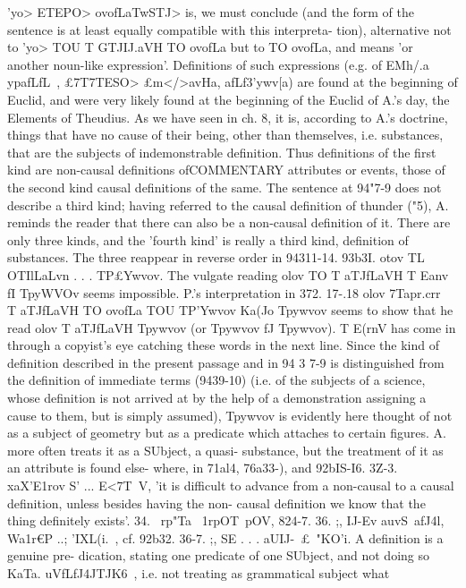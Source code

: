 {{{{{{{{{{{{{{{{{{{{{{{{{{{{{{{{{{{{{{{'\6yo> ETEPO> ovofLaTwSTJ> is, we must conclude (and the form of
the sentence is at least equally compatible with this interpreta-
tion), alternative not to '\6yo> TOU T{ GTJIJ.a{VH TO ovofLa but to TO
ovofLa, and means 'or another noun-like expression'. Definitions
of such expressions (e.g. of EMh/.a ypafLfL~, £7T{7TESO> £m</>avHa,
afLf3'\ELa ywv[a) are found at the beginning of Euclid, and were
very likely found at the beginning of the Euclid of A.'s day, the
Elements of Theudius.
As we have seen in ch. 8, it is, according to A.'s doctrine, things
that have no cause of their being, other than themselves, i.e.
substances, that are the subjects of indemonstrable definition.
Thus definitions of the first kind are non-causal definitions ofCOMMENTARY
attributes or events, those of the second kind causal definitions
of the same. The sentence at 94"7-9 does not describe a third
kind; having referred to the causal definition of thunder ("5), A.
reminds the reader that there can also be a non-causal definition
of it. There are only three kinds, and the 'fourth kind' is really
a third kind, definition of substances. The three reappear in
reverse order in 94311-14.
93b3I. otov TL OTIlLaLvn . . . TP£Ywvov. The vulgate reading
olov TO T{ aTJfLa{VH T{ Eanv fI Tp{yWVOv seems impossible. P.'s
interpretation in 372. 17-.18 olov 7Tapr.crr~ T{ aTJfLa{VH TO ovofLa TOU
TP'Ywvov Ka(Jo Tp{ywvov seems to show that he read olov T{ aTJfLa{VH
Tp{ywvov (or Tp{ywvov fJ Tp{ywvov). T{ E(rnV has come in through a
copyist's eye catching these words in the next line.
Since the kind of definition described in the present passage
and in 94 3 7-9 is distinguished from the definition of immediate
terms (9439-10) (i.e. of the subjects of a science, whose definition
is not arrived at by the help of a demonstration assigning a cause
to them, but is simply assumed), Tp{ywvov is evidently here thought
of not as a subject of geometry but as a predicate which attaches
to certain figures. A. more often treats it as a SUbject, a quasi-
substance, but the treatment of it as an attribute is found else-
where, in 71al4, 76a33-{), and 92bIS-I6.
3Z-3. xaX'E1rov S' ... E<7T~V, 'it is difficult to advance from a
non-causal to a causal definition, unless besides having the non-
causal definition we know that the thing definitely exists'.
34. ~rp"Ta~ 1rpOT~pOV, 824-7.
36. ;, IJ-Ev auvS~afJ4l, Wa1r€P ..; 'IXL(i.~, cf. 92b32.
36-7. ;, SE . . . aUIJ-~£~"KO'i. A definition is a genuine pre-
dication, stating one predicate of one SUbject, and not doing so
KaTa. uVfLfJ4JTJK6~, i.e. not treating as grammatical subject what
}}}}}}}}}}}}}}}}}}}}}}}}}}}}}}}}}}}}}}}}}}}}}}}}}}}}}}}}}
